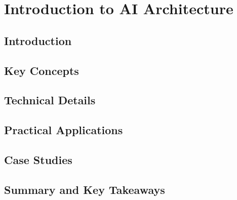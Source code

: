 ﻿%

\chapter{Introduction to AI Architecture}
\label{ch:chapter-01}

\section{Introduction}


\section{Key Concepts}


\section{Technical Details}


\section{Practical Applications}


\section{Case Studies}


\section{Summary and Key Takeaways}


